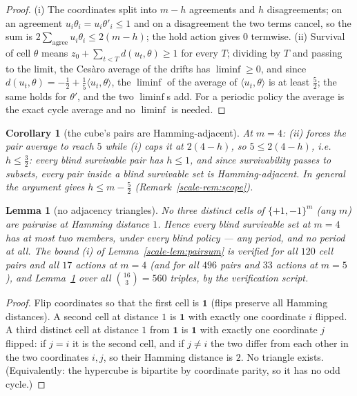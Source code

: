 \documentclass[10pt,twocolumn]{article}
\theoremstyle{plain}
\newtheorem{lemma}[theorem]{Lemma}
\newtheorem{corollary}[theorem]{Corollary}
\theoremstyle{definition}
\theoremstyle{remark}
\begin{document}
\begin{proof}
(i) The coordinates split into \(m - h\) agreements and \(h\)
disagreements; on an agreement \(u_{i}\theta_{i} = u_{i}\theta'_{i}
\le 1\) and on a disagreement the two terms cancel, so the sum is
\(2 \sum_{\text{agree}} u_{i}\theta_{i} \le 2(m-h)\); the hold
action gives \(0\) termwise. (ii) Survival of cell \(\theta\) means
\(z_{0} + \sum_{t < T} d(u_{t}, \theta) \ge 1\) for every \(T\);
dividing by \(T\) and passing to the limit, the Ces\`aro average of
the drifts has \(\liminf \ge 0\), and since
\(d(u_{t}, \theta) = -\tfrac12 + \tfrac15\langle u_{t},
\theta\rangle\), the \(\liminf\) of the average of
\(\langle u_{t}, \theta\rangle\) is at least
\(\tfrac52\); the same holds for \(\theta'\), and the two
\(\liminf\)s add. For a periodic policy the average is the exact
cycle average and no \(\liminf\) is needed.
\end{proof}

\begin{corollary}[the cube's pairs are Hamming-adjacent]
\label{scale-cor:hamming}
At \(m = 4\): (ii) forces the pair average to reach \(5\) while (i)
caps it at \(2(4 - h)\), so \(5 \le 2(4 - h)\), i.e.\
\(h \le \tfrac32\): every blind survivable pair has \(h \le 1\),
and since survivability passes to subsets, every pair inside a blind
survivable set is Hamming-adjacent. In general the argument gives
\(h \le m - \tfrac52\) (Remark~\ref{scale-rem:scope}).
\end{corollary}

\begin{lemma}[no adjacency triangles]\label{scale-lem:triangle}
No three distinct cells of \(\{+1,-1\}^{m}\) (any \(m\)) are
pairwise at Hamming distance \(1\). Hence every blind survivable set
at \(m = 4\) has at most two members, under every blind policy ---
any period, and no period at all. The bound (i) of
Lemma~\ref{scale-lem:pairsum} is verified for all \(120\) cell pairs and
all \(17\) actions at \(m = 4\) (and for all \(496\) pairs and
\(33\) actions at \(m = 5\)), and
Lemma~\ref{scale-lem:triangle} over all \(\binom{16}{3} = 560\) triples, by the verification script.
\end{lemma}

\begin{proof}
Flip coordinates so that the first cell is \(\mathbf{1}\) (flips
preserve all Hamming distances). A second cell at distance \(1\) is
\(\mathbf{1}\) with exactly one coordinate \(i\) flipped. A third
distinct cell at distance \(1\) from \(\mathbf{1}\) is
\(\mathbf{1}\) with exactly one coordinate \(j\) flipped: if
\(j = i\) it is the second cell, and if \(j \neq i\) the two differ
from each other in the two coordinates \(i, j\), so their Hamming
distance is \(2\). No triangle exists. (Equivalently: the hypercube
is bipartite by coordinate parity, so it has no odd cycle.)
\end{proof}
\end{document}
